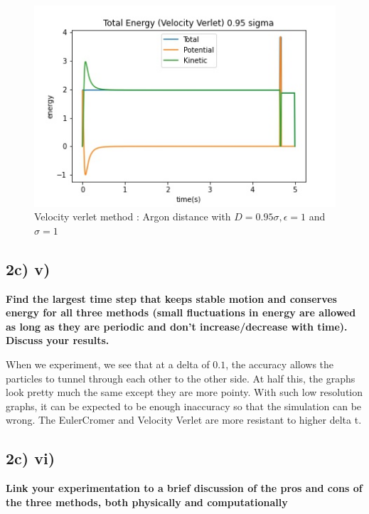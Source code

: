 \begin{figure}[h!]
        \centering 
        \includegraphics[scale=0.8]{./py/2civ_allEnergiesVelocityVerlet095.jpg} 
        \caption{Velocity verlet  method : Argon distance with $D = 0.95 \sigma, \epsilon = 1$ and $\sigma = 1$ }
        \label{fig:allEnergiesVerlet95}
\end{figure}





\subsection*{2c) v)}
\textbf{Find the largest time step that keeps stable motion and conserves energy for all three methods
(small fluctuations in energy are allowed as long as they are periodic and don’t increase/decrease
with time). Discuss your results.
}

When we experiment, we see that at a delta of $0.1$, the accuracy allows the particles to tunnel through each other to the other side. At half this, the graphs look pretty much the same except they are more pointy. With such low resolution graphs, it can be expected to be enough inaccuracy so that the simulation can be wrong.
The EulerCromer and Velocity Verlet are more resistant to higher delta t.

\subsection*{2c) vi)}
\textbf{Link your experimentation to a brief discussion of the pros and cons of the three methods, both
physically and computationally}

